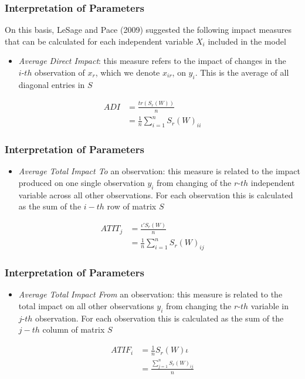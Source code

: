\documentclass[
  shownotes,
  xcolor={svgnames},
  hyperref={colorlinks,citecolor=DarkBlue,linkcolor=DarkRed,urlcolor=DarkBlue}
  ]{beamer}
\begin{document}
\begin{frame}
\frametitle{Interpretation of Parameters}
On this basis, LeSage and Pace (2009) suggested the following impact measures that can be calculated for each independent variable $X_i$ included in the model 

\begin{itemize}
\item {\it Average Direct Impact}: this measure refers to the impact of changes in the $i‐th$ observation of $x_r$, which we denote $x_{ir}$, on $y_i$. This is the average of all diagonal entries in $S$
\end{itemize}

\begin{align}
ADI &= \frac{tr(S_r(W))}{n} \nonumber \\
&= \frac{1}{n}\sum_{i=1}^n S_r(W)_{ii}
\end{align}


\end{frame}
\begin{frame}
\frametitle{Interpretation of Parameters}

\begin{itemize}
\item {\it Average Total Impact To} an observation: this measure is related to the impact produced on one single observation $y_i$ from changing of the $r‐th$ independent variable across all other observations. For each observation this is calculated as the sum of the $i-th$ row of matrix $S$
\end{itemize}

\begin{align}
ATIT_j &= \frac{\iota'S_r(W)}{n} \nonumber \\
&= \frac{1}{n}\sum_{i=1}^n S_r(W)_{ij}
\end{align}


\end{frame}
\begin{frame}
\frametitle{Interpretation of Parameters}

\begin{itemize}
\item {\it Average Total Impact From} an observation: this measure is related to the total impact on all other observations $y_i$ from changing the $r‐th$ variable in $j‐th$ observation. For each observation this is calculated as the sum of the $j-th$ column of matrix $S$
\end{itemize}

\begin{align}
ATIF_i &= \frac{1}{n}S_r(W)\iota \nonumber \\
&= \frac{\sum_{j=1}^n S_r(W)_{ij}}{n} 
\end{align}


\end{frame}
\end{document}
